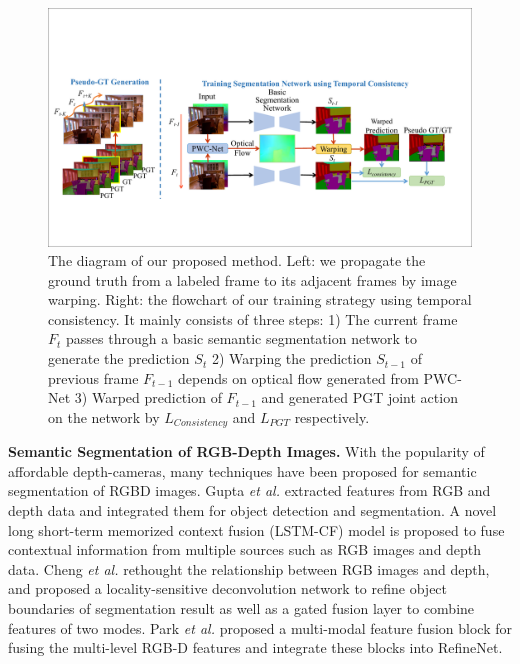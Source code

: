 \begin{figure}[htbp]
	\setlength{\abovecaptionskip}{0pt} 
	\setlength{\belowcaptionskip}{10pt}
	\centering
	\centering
	\includegraphics[scale=0.56]{figure/Pipeline.pdf}
	\caption{The diagram of our proposed method. Left: we propagate the ground truth from a labeled frame to its adjacent frames by image warping. Right: the flowchart of our training strategy using temporal consistency. 
	It mainly consists of three steps: 1) The current frame $F_t$ passes through a basic semantic segmentation network to generate the prediction $S_{t}$ 2) Warping the prediction $S_{t-1}$ of previous frame $F_{t-1}$ depends on optical flow generated from PWC-Net \cite{Sun2018} 3) Warped prediction of $F_{t-1}$ and generated PGT joint action on the network by $L_{Consistency}$ and $L_{PGT}$ respectively.
		}
	\label{fig:Pipeline}
	\vspace*{-0.2cm}
\end{figure}
 

\noindent \textbf{Semantic Segmentation of RGB-Depth Images.}
%
With the popularity of affordable depth-cameras, many techniques have been proposed for semantic segmentation of RGBD images.
%
Gupta \emph{et al.} \cite{Gupta2014} extracted features from RGB and depth data and integrated them for object detection and segmentation.
%
A novel long short-term memorized context fusion (LSTM-CF) model is proposed \cite{Li2016} to fuse contextual information from multiple sources such as RGB images and depth data.
% 
Cheng \emph{et al.} \cite{Cheng2017} rethought the relationship between RGB images and depth, and proposed a locality-sensitive deconvolution network to refine object boundaries of segmentation result as well as a gated fusion layer to combine features of two modes.
%
Park \emph{et al.} \cite{Park2017} proposed a multi-modal feature fusion block for fusing the multi-level RGB-D features and integrate these blocks into RefineNet.


